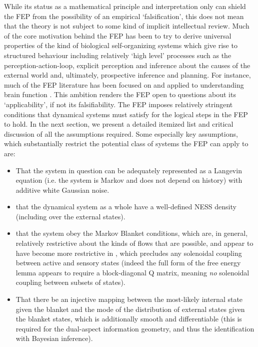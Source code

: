 While its status as a mathematical principle and interpretation only can shield the FEP from the possibility of an empirical `falsification', this does not mean that the theory is not subject to some kind of implicit intellectual review. Much of the core motivation behind the FEP has been to try to derive universal properties of the kind of biological self-organizing systems which give rise to structured behaviour including relatively `high level' processes such as the perception-action-loop, explicit perception and inference about the causes of the external world and, ultimately, prospective inference and planning. For instance, much of the FEP literature has been focused on and applied to understanding brain function \citep{friston2008hierarchical,friston2015active,friston2017process}. This ambition renders the FEP open to questions about its `applicability', if not its falsifiability. The FEP imposes relatively stringent conditions that dynamical systems must satisfy for the logical steps in the FEP to hold. In the next section, we present a detailed itemized list and critical discussion of all the assumptions required. Some especially key assumptions, which substantially restrict the potential class of systems the FEP can apply to are:
\begin{itemize}
\item That the system in question can be adequately represented as a Langevin equation (i.e. the system is Markov and does not depend on history) with additive white Gaussian noise.
\item that the dynamical system as a whole have a well-defined NESS density (including over the external states).
\item that the system obey the Markov Blanket conditions, which are, in general, relatively restrictive about the kinds of flows that are possible, and appear to have become more restrictive in \citet{friston2020some}, which precludes any solenoidal coupling between active and sensory states (indeed the full form of the free energy lemma appears to require a block-diagonal Q matrix, meaning \emph{no} solenoidal coupling between subsets of states).
\item That there be an injective mapping between the most-likely internal state given the blanket and the mode of the distribution of external states given the blanket states, which is additionally smooth and differentiable (this is required for the dual-aspect information geometry, and thus the identification with Bayesian inference).
\end{itemize}
